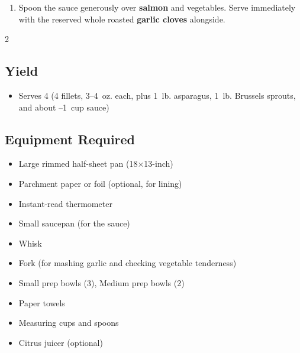 \documentclass[11pt,letterpaper]{article}
\begin{document}
\begin{enumerate}
    \item Spoon the sauce generously over \textbf{salmon} and vegetables. Serve immediately with the reserved whole roasted \textbf{garlic cloves} alongside.
\end{enumerate}

\newpage

{\footnotesize
\setlength{\columnsep}{20pt}
\setlength{\multicolsep}{6pt}
\begin{multicols}{2}
\setlength{\parindent}{0pt}
\setlength{\parskip}{2pt}
\setlength{\itemsep}{0pt}
\setlength{\parsep}{0pt}

\subsection*{Yield}
\begin{itemize}
    \item Serves 4 (4 fillets, 3--4~oz. each, plus 1~lb. asparagus, 1~lb. Brussels sprouts, and about --1~cup sauce)
\end{itemize}

\subsection*{Equipment Required}
\begin{itemize}
    \item Large rimmed half-sheet pan (18$\times$13-inch)
    \item Parchment paper or foil (optional, for lining)
    \item Instant-read thermometer
    \item Small saucepan (for the sauce)
    \item Whisk
    \item Fork (for mashing garlic and checking vegetable tenderness)
    \item Small prep bowls (3), Medium prep bowls (2)
    \item Paper towels
    \item Measuring cups and spoons
    \item Citrus juicer (optional)
\end{itemize}


\end{multicols}}
\end{document}

